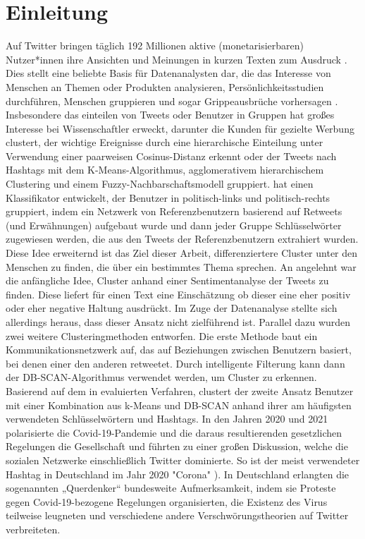 \chapter{Einleitung}
\label{chap:einleitung}
Auf Twitter bringen täglich 192 Millionen aktive (monetarisierbaren) Nutzer*innen ihre Ansichten und Meinungen in kurzen Texten zum Ausdruck \cite{twitter-mdau}. Dies stellt eine beliebte Basis für Datenanalysten dar, die das Interesse von Menschen an Themen oder Produkten analysieren, Persönlichkeitsstudien durchführen, Menschen gruppieren und sogar Grippeausbrüche vorhersagen \cite{Achrekar2011}. Insbesondere das einteilen von Tweets oder Benutzer in Gruppen hat großes Interesse bei Wissenschaftler erweckt, darunter \cite{Friedemann2015C} die Kunden für gezielte Werbung  clustert, \cite{Ifrim2014}  der wichtige Ereignisse durch eine hierarchische Einteilung unter Verwendung einer paarweisen Cosinus-Distanz erkennt oder \cite{Miyamoto2021} der Tweets nach Hashtags mit dem K-Means-Algorithmus, agglomerativem hierarchischem Clustering und einem Fuzzy-Nachbarschaftsmodell gruppiert. \cite{Conover2011-2} hat einen Klassifikator entwickelt, der Benutzer in politisch-links und politisch-rechts gruppiert, indem ein Netzwerk von Referenzbenutzern basierend auf Retweets (und Erwähnungen) aufgebaut wurde und dann jeder Gruppe Schlüsselwörter zugewiesen werden, die aus den Tweets der Referenzbenutzern extrahiert wurden. \\ \newline
Diese Idee erweiternd ist das Ziel dieser Arbeit, differenziertere Cluster unter den Menschen zu finden, die über ein bestimmtes Thema sprechen. An \cite{Kharde2016} angelehnt war die anfängliche Idee, Cluster anhand einer Sentimentanalyse der Tweets zu finden. Diese liefert für einen Text eine Einschätzung ob dieser eine eher positiv oder eher negative Haltung ausdrückt. Im Zuge der Datenanalyse stellte sich allerdings heraus, dass dieser Ansatz nicht zielführend ist. Parallel dazu wurden zwei weitere Clusteringmethoden entworfen.  Die erste Methode baut ein Kommunikationsnetzwerk auf, das auf Beziehungen zwischen Benutzern basiert, bei denen einer den anderen retweetet. Durch intelligente Filterung kann dann der DB-SCAN-Algorithmus verwendet werden, um Cluster zu erkennen. \\ \newline
Basierend auf dem in \cite{Godfrey2014} evaluierten Verfahren, clustert der zweite Ansatz Benutzer mit einer Kombination aus k-Means und DB-SCAN anhand ihrer am häufigsten verwendeten Schlüsselwörtern und Hashtags. In den Jahren 2020 und 2021 polarisierte die Covid-19-Pandemie und die daraus resultierenden gesetzlichen Regelungen die Gesellschaft und führten zu einer großen Diskussion, welche die sozialen Netzwerke einschließlich Twitter dominierte. So ist der meist verwendeter Hashtag in Deutschland im Jahr 2020 "Corona" \cite{top-hashtags-de}). In Deutschland erlangten die sogenannten „Querdenker“ bundesweite Aufmerksamkeit, indem sie Proteste gegen Covid-19-bezogene Regelungen organisierten, die Existenz des Virus teilweise leugneten und verschiedene andere Verschwörungstheorien auf Twitter verbreiteten. \\ \newline
